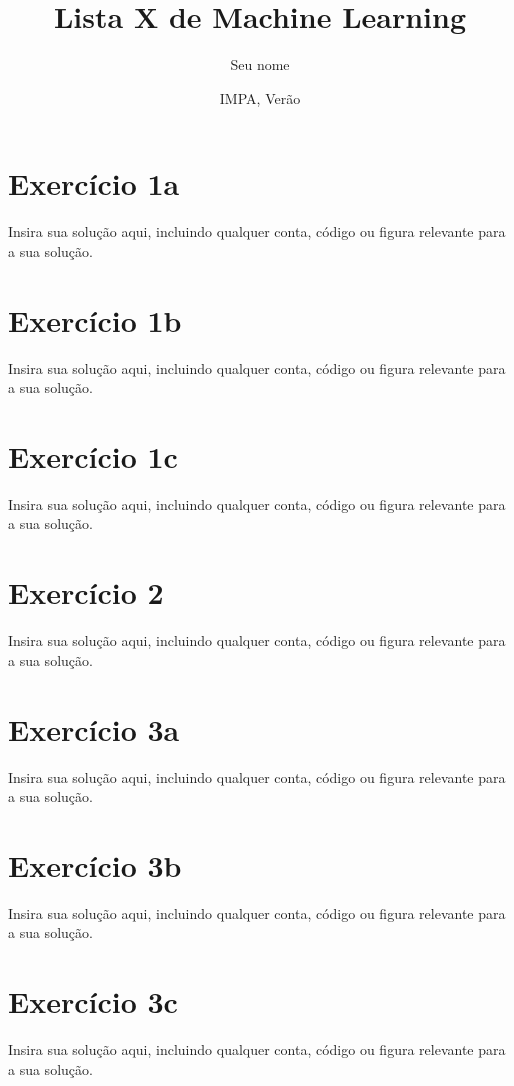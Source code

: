 \documentclass[11pt]{article}
\title{Lista X de Machine Learning}
\author{Seu nome}
\date{IMPA, Verão \the\year}
\begin{document}
\maketitle

\tableofcontents
\pagebreak

\section{Exercício 1a}
Insira sua solução aqui, incluindo qualquer conta, código ou figura relevante para a sua solução.

\newpage

\section{Exercício 1b}
Insira sua solução aqui, incluindo qualquer conta, código ou figura relevante para a sua solução.

\newpage

\section{Exercício 1c}
Insira sua solução aqui, incluindo qualquer conta, código ou figura relevante para a sua solução.

\newpage


\section{Exercício 2}
Insira sua solução aqui, incluindo qualquer conta, código ou figura relevante para a sua solução.

\newpage


\section{Exercício 3a}
Insira sua solução aqui, incluindo qualquer conta, código ou figura relevante para a sua solução.

\newpage

\section{Exercício 3b}
Insira sua solução aqui, incluindo qualquer conta, código ou figura relevante para a sua solução.

\newpage

\section{Exercício 3c}
Insira sua solução aqui, incluindo qualquer conta, código ou figura relevante para a sua solução.
\end{document}
